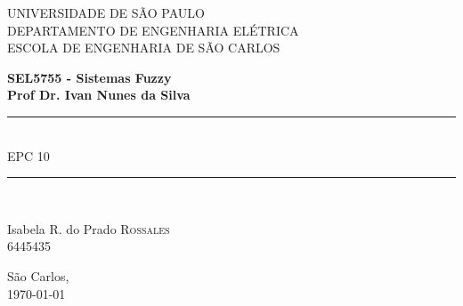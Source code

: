 \documentclass{report}
\begin{document}
\newcommand{\HRule}{\rule{\linewidth}{0.5mm}}
\newcommand{\tsize}[1]{(\frac{W}{L})_{#1}}
 

\begin{titlepage}

\begin{center}


{\LARGE UNIVERSIDADE DE SÃO PAULO\\}
{\LARGE DEPARTAMENTO DE ENGENHARIA ELÉTRICA \\}
{\LARGE ESCOLA DE ENGENHARIA DE SÃO CARLOS\\[4cm]}

\textbf{\large SEL5755 - Sistemas Fuzzy}\\[1cm]
\textbf{\large Prof Dr. Ivan Nunes da Silva}\\[2cm]


\HRule \\[0.6cm]
{ \huge EPC 10\bfseries }\\[0.6cm]

\HRule \\[2cm]


\begin{center} \large
\end{center}

\begin{minipage}{\textwidth}
\begin{flushleft} \large
Isabela R. do Prado \textsc{Rossales}\\
6445435
\end{flushleft}
\end{minipage}

\vfill

{\large São Carlos,\\ \today}

\end{center}

\end{titlepage}


\newpage



\end{document}

